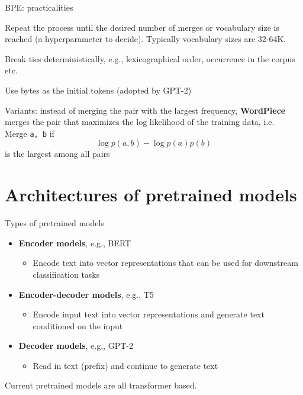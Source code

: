 \documentclass[usenames,dvipsnames,notes,11pt,aspectratio=169,hyperref={colorlinks=true, linkcolor=blue}]{beamer}
\begin{document}
\begin{frame}
    {BPE: practicalities}
    \begin{wideitemize}
        \item Repeat the process until the desired number of merges or vocabulary size is reached (a hyperparameter to decide). Typically vocabulary sizes are 32-64K.
        \item Break ties deterministically, e.g., lexicographical order, occurrence in the corpus etc.
        \item Use bytes as the initial tokens (adopted by GPT-2)
        \item Variants: instead of merging the pair with the largest frequency, {\bf WordPiece} merges the pair that maximizes the log likelihood of the training data, i.e.\\
            Merge {\tt a, b} if $$\log p(a, b) - \log p(a)p(b)$$ is the largest among all pairs
    \end{wideitemize}
\end{frame}

\section{Architectures of pretrained models}

\begin{frame}
    {Types of pretrained models}
   
    \begin{itemize}[<+->]
        \itemsep1em
        \item \textbf{Encoder models}, e.g., BERT
            \begin{itemize}[<.->]
                \item Encode text into vector representations that can be used for downstream classification tasks
            \end{itemize}
        \item \textbf{Encoder-decoder models}, e.g., T5
            \begin{itemize}[<.->]
                \item Encode input text into vector representations and generate text conditioned on the input
            \end{itemize}
        \item \textbf{Decoder models}, e.g., GPT-2
            \begin{itemize}[<.->]
                \item Read in text (prefix) and continue to generate text
            \end{itemize}
    \end{itemize}

    \pause\medskip
    Current pretrained models are all transformer based.
\end{frame}
\end{document}
